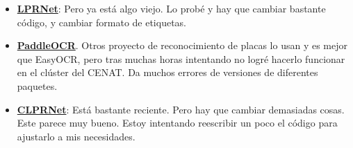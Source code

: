 \documentclass[12pt,a4paper]{article}
\begin{document}
\begin{itemize}
	\item \textbf{\href{https://github.com/mesakarghm/LPRNET.git}{LPRNet}}: Pero ya está algo 
		viejo. Lo probé y hay que cambiar bastante código, y cambiar formato de etiquetas.

	\item \textbf{\href{https://github.com/PaddlePaddle/PaddleOCR.git}{PaddleOCR}}.
		Otros proyecto de reconocimiento de placas lo usan y es mejor que EasyOCR, 
	pero tras muchas horas intentando no logré hacerlo funcionar en el clúster del CENAT. Da muchos errores
		de versiones de diferentes paquetes.

	\item \textbf{\href{https://github.com/wulb97/CLPRNet.git}{CLPRNet}}: Está bastante reciente.
		Pero hay que cambiar demasiadas cosas. Este parece muy bueno.
		Estoy intentando reescribir un poco el código para ajustarlo a mis necesidades.
\end{itemize}
\end{document}
